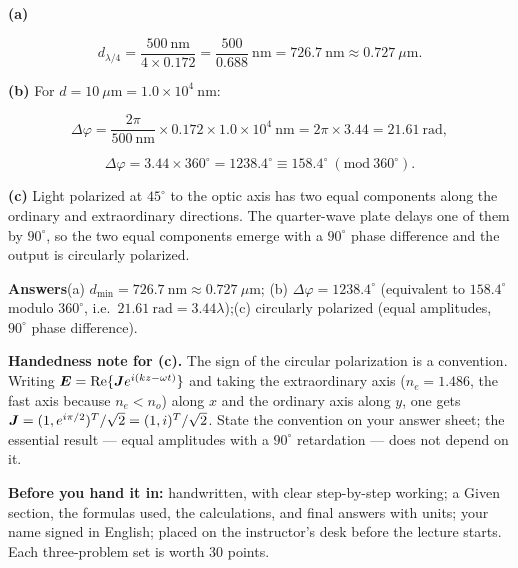 \documentclass[11pt]{ctexart}
\begin{document}
\textbf{(a)}

\[
d_{\lambda/4}=\frac{500\ \mathrm{nm}}{4\times0.172}
=\frac{500}{0.688}\ \mathrm{nm}
=726.7\ \mathrm{nm}\approx0.727\ \mu\mathrm{m}.
\]

\textbf{(b)} For $d=10\ \mu\mathrm{m}=1.0\times10^{4}\ \mathrm{nm}$:

\[
\Delta\varphi=\frac{2\pi}{500\ \mathrm{nm}}\times0.172\times1.0\times10^{4}\ \mathrm{nm}
=2\pi\times3.44=21.61\ \mathrm{rad},
\]

\[
\Delta\varphi=3.44\times360^\circ=1238.4^\circ
\equiv158.4^\circ\ (\mathrm{mod}\ 360^\circ).
\]

\textbf{(c)} Light polarized at $45^\circ$ to the optic axis has two equal components along the ordinary and
extraordinary directions. The quarter-wave plate delays one of them by $90^\circ$, so the two equal components
emerge with a $90^\circ$ phase difference and the output is circularly polarized.

\textbf{Answers}\quad (a) $d_{\min}=726.7\ \mathrm{nm}\approx0.727\ \mu\mathrm{m}$;\quad
(b) $\Delta\varphi=1238.4^\circ$ (equivalent to $158.4^\circ$ modulo $360^\circ$, i.e.\ $21.61\ \mathrm{rad}
=3.44\lambda$);\quad (c) circularly polarized (equal amplitudes, $90^\circ$ phase difference).

{\small\color{inkgray}\textbf{Handedness note for (c).} The sign of the circular polarization is a convention.
Writing $\boldsymbol{E}=\mathrm{Re}\{\boldsymbol{J} e^{i(kz-\omega t)}\}$ and taking the extraordinary axis
($n_e=1.486$, the fast axis because $n_e<n_o$) along $x$ and the ordinary axis along $y$, one gets
$\boldsymbol{J}=(1,e^{i\pi/2})^T/\sqrt2=(1,i)^T/\sqrt2$. State the convention on your answer sheet; the essential
result — equal amplitudes with a $90^\circ$ retardation — does not depend on it.}

\vspace{4pt}
{\small\color{inkgray}\textbf{Before you hand it in:} handwritten, with clear step-by-step working; a Given
section, the formulas used, the calculations, and final answers with units; your name signed in English;
placed on the instructor's desk before the lecture starts. Each three-problem set is worth 30 points.}
\end{document}
